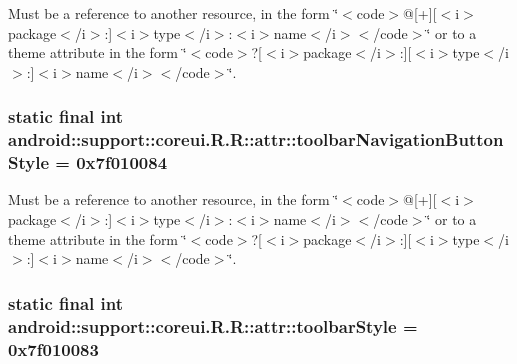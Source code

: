 Must be a reference to another resource, in the form \char`\"{}$<$code$>$@\mbox{[}+\mbox{]}\mbox{[}$<$i$>$package$<$/i$>$:\mbox{]}$<$i$>$type$<$/i$>$:$<$i$>$name$<$/i$>$$<$/code$>$\char`\"{} or to a theme attribute in the form \char`\"{}$<$code$>$?\mbox{[}$<$i$>$package$<$/i$>$:\mbox{]}\mbox{[}$<$i$>$type$<$/i$>$:\mbox{]}$<$i$>$name$<$/i$>$$<$/code$>$\char`\"{}. \hypertarget{classandroid_1_1support_1_1coreui_1_1_r_1_1attr_7ac2a2492b2abbf10a640b48e52e4072}{
\subsubsection[{toolbarNavigationButtonStyle}]{\setlength{\rightskip}{0pt plus 5cm}static final int android::support::coreui.R.R::attr::toolbarNavigationButtonStyle = 0x7f010084}}
\label{classandroid_1_1support_1_1coreui_1_1_r_1_1attr_7ac2a2492b2abbf10a640b48e52e4072}


Must be a reference to another resource, in the form \char`\"{}$<$code$>$@\mbox{[}+\mbox{]}\mbox{[}$<$i$>$package$<$/i$>$:\mbox{]}$<$i$>$type$<$/i$>$:$<$i$>$name$<$/i$>$$<$/code$>$\char`\"{} or to a theme attribute in the form \char`\"{}$<$code$>$?\mbox{[}$<$i$>$package$<$/i$>$:\mbox{]}\mbox{[}$<$i$>$type$<$/i$>$:\mbox{]}$<$i$>$name$<$/i$>$$<$/code$>$\char`\"{}. \hypertarget{classandroid_1_1support_1_1coreui_1_1_r_1_1attr_01ab2c64645aef17e217f358dd1d5e65}{
\subsubsection[{toolbarStyle}]{\setlength{\rightskip}{0pt plus 5cm}static final int android::support::coreui.R.R::attr::toolbarStyle = 0x7f010083}}
\label{classandroid_1_1support_1_1coreui_1_1_r_1_1attr_01ab2c64645aef17e217f358dd1d5e65}


